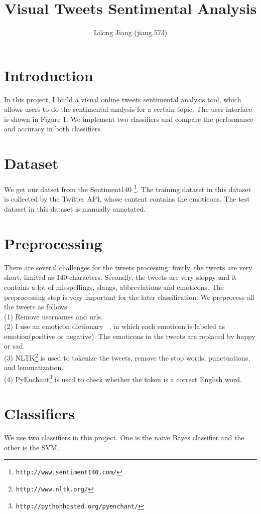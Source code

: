 \documentclass{article}
\begin{document}
\title{Visual Tweets Sentimental Analysis}
\author{Lilong Jiang (jiang.573)}
\maketitle

\section{Introduction}
In this project, I build a visual online tweets sentimental analysis tool, which allows users to do the sentimental analysis for a certain topic. The user interface is shown in Figure 1. We implement two classifiers and compare the performance and accuracy in both classifiers. 
\section{Dataset}
We get our datset from the Sentiment140 \footnote{\texttt{\scriptsize{http://www.sentiment140.com/‎}}}. The training dataset in this dataset is collected by the Twitter API, whose content contains the emoticons. The test dataset in this dataset is manually annotated.
\section{Preprocessing}
There are several challenges for the tweets processing: firstly, the tweets are very short, limited as 140 characters. Secondly, the tweets are very sloppy and it contains a lot of misspellings, slangs, abbreviations and emoticons. The preprocessing step is very important for the later classification.
We preprocess all the tweets as follows: \\
(1) Remove usernames and urls. \\
(2) I use an emoticon dictionary ~\cite{agarwal2011sentiment}, in which each emoticon is labeled as emotion(positive or negative). The emoticons in the tweets are replaced by happy or sad. \\
(3) NLTK\footnote{\texttt{\scriptsize{http://www.nltk.org/‎‎}}} is used to tokenize the tweets, remove the stop words, punctuations, and lemmatization. \\
(4) PyEnchant\footnote{\texttt{\scriptsize{http://pythonhosted.org/pyenchant/‎‎}}} is used to check whether the token is a correct English word. \\ 
\section{Classifiers}
We use two classifiers in this project. One is the naive Bayes classifier and the other is the SVM. 
\end{document}
